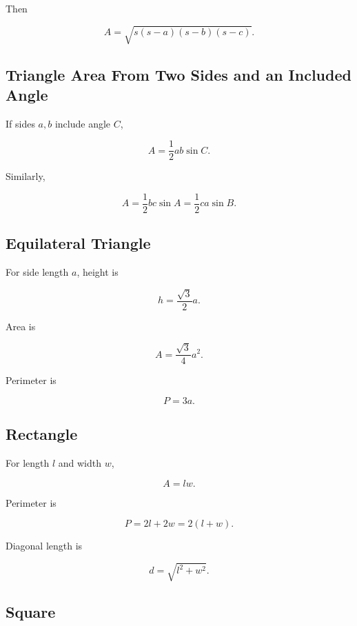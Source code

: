 Then

\[
\boxed{
A
=
\sqrt{
s(s-a)(s-b)(s-c)
}.
}
\]

\subsection{Triangle Area From Two Sides and an Included Angle}
\label{subsec:triangle-area-trig}

If sides \(a,b\) include angle \(C\),

\[
\boxed{
A
=
\frac12ab\sin C.
}
\]

Similarly,

\[
\boxed{
A
=
\frac12bc\sin A
=
\frac12ca\sin B.
}
\]

\subsection{Equilateral Triangle}
\label{subsec:equilateral-triangle-formulas}

For side length \(a\), height is

\[
\boxed{
h
=
\frac{\sqrt3}{2}a.
}
\]

Area is

\[
\boxed{
A
=
\frac{\sqrt3}{4}a^2.
}
\]

Perimeter is

\[
\boxed{
P=3a.
}
\]

\subsection{Rectangle}
\label{subsec:rectangle-formulas}

For length \(l\) and width \(w\),

\[
\boxed{
A=lw.
}
\]

Perimeter is

\[
\boxed{
P=2l+2w
=
2(l+w).
}
\]

Diagonal length is

\[
\boxed{
d
=
\sqrt{l^2+w^2}.
}
\]

\subsection{Square}
\label{subsec:square-formulas}

